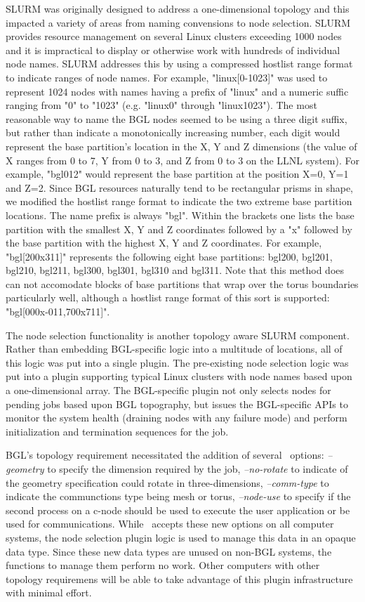 \documentclass[10pt,onecolumn,times]{../common/llncs}
\begin{document}
{SLURM was originally designed to address a one-dimensional topology
and this impacted a variety of areas from naming convensions to 
node selection. 
SLURM provides resource management on several Linux clusters 
exceeding 1000 nodes and it is impractical to display or otherwise 
work with hundreds of individual node names. 
SLURM addresses this by using a compressed hostlist range format to indicate 
ranges of node names. 
For example, "linux[0-1023]" was used to represent 1024 nodes 
with names having a prefix of "linux" and a numeric suffic ranging 
from "0" to "1023" (e.g. "linux0" through "linux1023"). 
The most reasonable way to name the BGL nodes seemed to be 
using a three digit suffix, but rather than indicate a monotonically 
increasing number, each digit would represent the base partition's 
location in the X, Y and Z dimensions (the value of X ranges 
from 0 to 7, Y from 0 to 3, and Z from 0 to 3 on the LLNL system).
For example, "bgl012" would represent the base partition at
the position X=0, Y=1 and Z=2.
Since BGL resources naturally tend to be rectangular prisms in 
shape, we modified the hostlist range format to indicate the two 
extreme base partition locations. 
The name prefix is always "bgl". 
Within the brackets one lists the base partition with the smallest
X, Y and Z coordinates followed by a "x" followed by the base 
partition with the highest X, Y and Z coordinates.
For example, "bgl[200x311]" represents the following eight base 
partitions: bgl200, bgl201, bgl210, bgl211, bgl300, bgl301, bgl310
and bgl311.
Note that this method does can not accomodate blocks of base 
partitions that wrap over the torus boundaries particularly well, 
although a hostlist range format of this sort is supported: 
"bgl[000x-011,700x711]".

The node selection functionality is another topology aware 
SLURM component. 
Rather than embedding BGL-specific logic into a multitude of 
locations, all of this logic was put into a single plugin. 
The pre-existing node selection logic was put into a plugin 
supporting typical Linux clusters with node names based 
upon a one-dimensional array. 
The BGL-specific plugin not only selects nodes for pending jobs 
based upon BGL topography, but issues the BGL-specific APIs 
to monitor the system health (draining nodes with any failure 
mode) and perform initialization and termination sequences for the job.

BGL's topology requirement necessitated the addition of several 
\srun\ options: {\em --geometry} to specify the dimension required by 
the job,
 {\em --no-rotate} to indicate of the geometry specification could rotate 
in three-dimensions,
{\em --comm-type} to indicate the communctions type being mesh or torus,
{\em --node-use} to specify if the second process on a c-node should 
be used to execute the user application or be used for communications. 
While \srun\ accepts these new options on all computer systems, 
the node selection plugin logic is used to manage this data in an 
opaque data type. 
Since these new data types are unused on non-BGL systems, the 
functions to manage them perform no work. 
Other computers with other topology requiremens will be able to 
take advantage of this plugin infrastructure with minimal effort.

}
\end{document}
